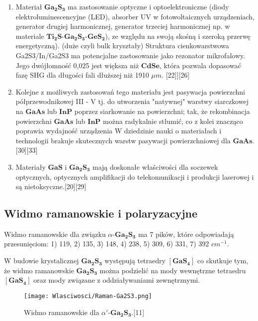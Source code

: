 \begin{enumerate}
	\item Materiał $\mathbf{Ga_{2}S_{3}}$ ma zastosowanie optyczne i optoelektroniczne (diody elektroluminescencyjne (LED), absorber UV w fotowoltaicznych urządzeniach, generator drugiej harmonicznej, generator trzeciej harmonicznej np. w materiale $\mathbf{Ti_{2}S}$-$\mathbf{Ga_{2}S_{3}}$-$\mathbf{GeS_{2}}$), ze względu na swoją skośną i szeroką przerwę energetyczną). (duże czyli bulk kryształy) Struktura cienkowarstwowa Ga2S3/In/Ga2S3 ma potencjalne zastosowanie jako rezonator mikrofalowy. Jego dwójłomność 0,025 jest większa niż $\mathbf{CdSe}$, która pozwala dopasować fazę SHG dla długości fali dłuższej niż 1910 $\mu m$. [22]][26]
	
	\item Kolejne z możliwych zastosowań tego materiału jest pasywacja powierzchni półprzewodnikowej III - V tj. do utworzenia "natywnej" warstwy siarczkowej na $\mathbf{GaAs}$ lub $\mathbf{InP}$ poprzez siarkowanie na powierzchni; tak, że rekombinacja powierzchni $\mathbf{GaAs}$ lub $\mathbf{InP}$ można radykalnie stłumić, co z kolei znacząco poprawia wydajność urządzenia W dziedzinie nauki o materiałach i technologii brakuje skutecznych warstw pasywacji powierzchniowej  dla $\mathbf{GaAs}$.[30][33]
	
	\item Materiały $\mathbf{GaS}$ i $\mathbf{Ga_{2}S_{3}}$ mają doskonałe właściwości dla soczewek optycznych, optycznych amplifikacji do telekomunikacji i produkcji laserowej i są nietoksyczne.[20][29]
\end{enumerate}

\newpage

\subsection{Widmo ramanowskie i polaryzacyjne}

Widmo ramanowskie dla związku $\alpha$-$\mathbf{Ga_{2}S_{3}}$ ma 7 pików, które odpowiadają przesunięciom: 1) 119, 2) 135, 3) 148, 4) 238, 5) 309, 6) 331, 7) 392 $cm^{-1}$.

W budowie krystalicznej $\mathbf{Ga_{2}S_{3}}$ występują tetraedry $[\mathbf{GaS_{4}}]$ co skutkuje tym, że widmo ramanowskie $\mathbf{Ga_{2}S_{3}}$ można podzielić na mody wewnętrzne tetraedru $[\mathbf{GaS_{4}}]$ oraz mody związane
z oddziaływaniami zewnętrznymi.


\begin{figure}[H]
	\begin{center}
		\texttt{[image: Wlasciwosci/Raman-Ga2S3.png]}
		\caption{Widmo ramanowskie dla $\alpha'$-$\mathbf{Ga_{2}S_{3}}$.[11]}
	\end{center}
\end{figure}

